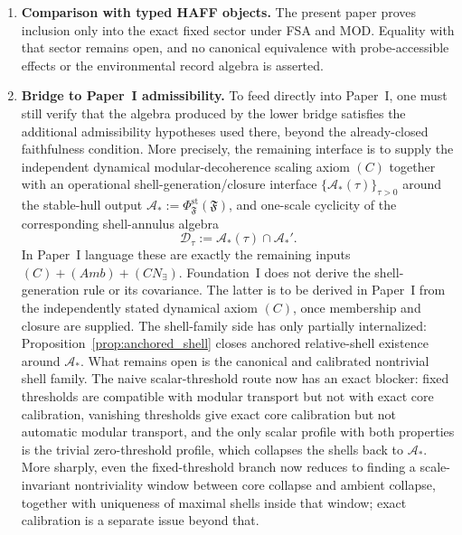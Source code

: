 \documentclass[12pt]{article}
\theoremstyle{definition}
\theoremstyle{remark}
\begin{document}
\begin{enumerate}
  bounds model-independently from the broken-phase output and the full
  T-DOME survival identity rather than assume them. Beyond the
  restricted regime, the unresolved analytic obstacles are explicit:
  cross-channel correlations need not decouple, pointer spectra need
  not remain finite or discrete, and the Hilbert--Schmidt control used
  here is not available in general Type~III infinite-dimensional
  settings, where a predual reformulation may be necessary. The
  pointer-sector existence input PS1 is treated here only as an
  exact-regime idealization; what remains genuinely open is the
  model-independent alignment step PS2 and the induced ordered-selection
  step PS3.
\item \textbf{Comparison with typed HAFF objects.} The present paper
  proves inclusion only into the exact fixed sector under FSA and MOD.
  Equality with that sector remains open, and no canonical equivalence
  with probe-accessible effects or the environmental record algebra is
  asserted.
\item \textbf{Bridge to Paper~I admissibility.} To feed directly into
  Paper~I, one must still verify that the algebra produced by the lower
  bridge satisfies the additional admissibility hypotheses used there,
  beyond the already-closed faithfulness condition. More precisely, the
  remaining interface is to supply the independent dynamical
  modular-decoherence scaling axiom \((C)\) together with an operational
  shell-generation/closure interface
  \(\{\mathcal A_*(\tau)\}_{\tau>0}\) around the stable-hull output
  \(\mathcal A_*:=\Phi_{\mathfrak F}^{\mathrm{st}}(\mathfrak F)\), and
  one-scale cyclicity of the corresponding shell-annulus algebra
  \[
  \mathcal D_{\tau}:=\mathcal A_*(\tau)\cap \mathcal A_*'.
  \]
  In Paper~I language these are exactly the remaining inputs
  \((C)+(Amb)+(CN_\exists)\). Foundation~I does not derive the
  shell-generation rule or its covariance. The latter is to be derived
  in Paper~I from the independently stated dynamical axiom \((C)\), once
  membership and closure are supplied. The shell-family side has only
  partially internalized: Proposition~\ref{prop:anchored_shell} closes
  anchored relative-shell existence around \(\mathcal A_*\). What
  remains open is the canonical and calibrated nontrivial shell family.
  The naive scalar-threshold route now has an exact blocker: fixed
  thresholds are compatible with modular transport but not with exact
  core calibration, vanishing thresholds give exact core calibration but
  not automatic modular transport, and the only scalar profile with
  both properties is the trivial zero-threshold profile, which
  collapses the shells back to \(\mathcal A_*\). More sharply, even the
  fixed-threshold branch now reduces to finding a scale-invariant
  nontriviality window between core collapse and ambient collapse,
  together with uniqueness of maximal shells inside that window; exact
  calibration is a separate issue beyond that.
\end{enumerate}
\end{document}

